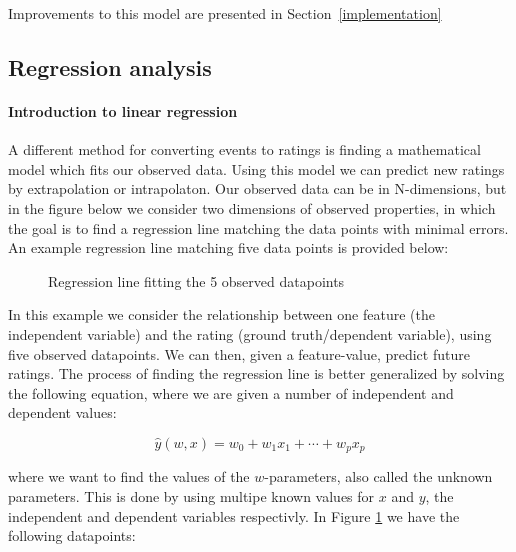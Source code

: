 Improvements to this model are presented in Section~\ref{implementation}

\subsection{Regression analysis}
\label{sec:regression-sota}

\paragraph{Introduction to linear regression}
A different method for converting events to ratings is finding a mathematical
model which fits our observed data. Using this model we can predict new ratings
by extrapolation or intrapolaton. Our observed data can be in N-dimensions, but
in the figure below we consider two dimensions of observed properties, in which
the goal is to find a regression line matching the data points with minimal
errors. An example regression line matching five data points is provided below:

\begin{figure}[H]
  \centering
  \label{fig-regression}
  \caption{Regression line fitting the 5 observed datapoints}
\end{figure}

In this example we consider the relationship between one feature (the
independent variable) and the rating (ground truth/dependent variable), using
five observed datapoints. We can then, given a feature-value, predict future
ratings. The process of finding the regression line is better generalized by
solving the following equation, where we are given a number of independent and
dependent values:

\begin{equation}
  \label{eq-regression}
  \hat{y}(w,x) = w_0 + w_1 x_1 + \cdots + w_p x_p
\end{equation}

where we want to find the values of the $w$-parameters, also called the unknown
parameters. This is done by using multipe known values for $x$ and $y$, the
independent and dependent variables respectivly. In Figure \ref{fig-regression}
we have the following datapoints:

